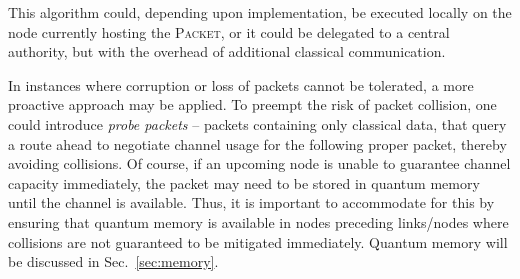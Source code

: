 This algorithm could, depending upon implementation, be executed locally on the node currently hosting the \textsc{Packet}, or it could be delegated to a central authority, but with the overhead of additional classical communication.

In instances where corruption or loss of packets cannot be tolerated, a more proactive approach may be applied. To preempt the risk of packet collision, one could introduce \textit{probe packets} -- packets containing only classical data, that query a route ahead to negotiate channel usage for the following proper packet, thereby avoiding collisions. Of course, if an upcoming node is unable to guarantee channel capacity immediately, the packet may need to be stored in quantum memory until the channel is available. Thus, it is important to accommodate for this by ensuring that quantum memory is available in nodes preceding links/nodes where collisions are not guaranteed to be mitigated immediately. Quantum memory will be discussed in Sec.~\ref{sec:memory}.